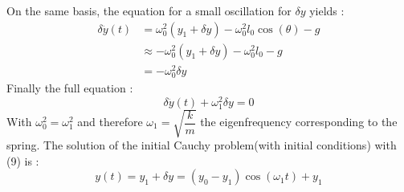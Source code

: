 	On the same basis, the equation for a small oscillation for $\delta y$ yields : 
	\begin{align*}
	\delta\ddot{y}(t)&=\omega_0^2(y_1 +\delta y)-\omega_0^2l_0\cos(\theta)-g\\
	&\approx -\omega_0^2(y_1+\delta y) - \omega_0^2l_0-g\\
	&=-\omega_0^2\delta y
	\end{align*}
	Finally the full equation :
	\begin{equation}
	\delta \ddot{y}(t)+\omega_1^2\delta y=0
	\end{equation}
	With $\omega_0^2=\omega_1^2$ and therefore $\omega_1=\sqrt{\dfrac{k}{m}}$ 		the eigenfrequency corresponding to the spring. The solution of the initial Cauchy problem(with initial conditions) with (9) is : 
	\begin{equation}
		y(t)=y_1+\delta y=(y_0-y_1)\cos(\omega_1t)+y_1
	\end{equation}





